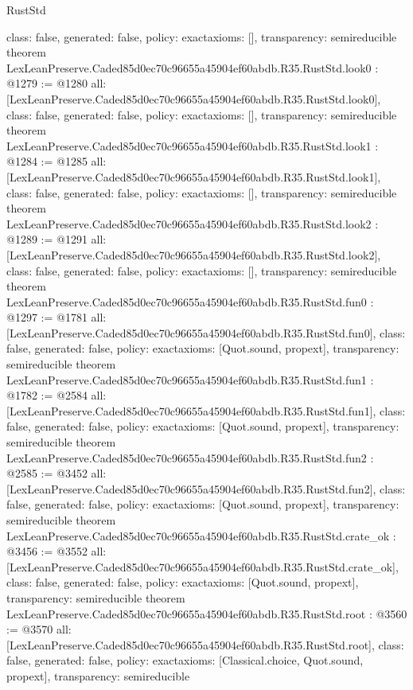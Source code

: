 \begin{lexlean}{RustStd}
\begin{coremodule}
{  class: false,
  generated: false,
  policy: exact{axioms: []},
  transparency: semireducible
}
theorem LexLeanPreserve.Caded85d0ec70c96655a45904ef60abdb.R35.RustStd.look0 : @1279 := @1280 {
  all: [LexLeanPreserve.Caded85d0ec70c96655a45904ef60abdb.R35.RustStd.look0],
  class: false,
  generated: false,
  policy: exact{axioms: []},
  transparency: semireducible
}
theorem LexLeanPreserve.Caded85d0ec70c96655a45904ef60abdb.R35.RustStd.look1 : @1284 := @1285 {
  all: [LexLeanPreserve.Caded85d0ec70c96655a45904ef60abdb.R35.RustStd.look1],
  class: false,
  generated: false,
  policy: exact{axioms: []},
  transparency: semireducible
}
theorem LexLeanPreserve.Caded85d0ec70c96655a45904ef60abdb.R35.RustStd.look2 : @1289 := @1291 {
  all: [LexLeanPreserve.Caded85d0ec70c96655a45904ef60abdb.R35.RustStd.look2],
  class: false,
  generated: false,
  policy: exact{axioms: []},
  transparency: semireducible
}
theorem LexLeanPreserve.Caded85d0ec70c96655a45904ef60abdb.R35.RustStd.fun0 : @1297 := @1781 {
  all: [LexLeanPreserve.Caded85d0ec70c96655a45904ef60abdb.R35.RustStd.fun0],
  class: false,
  generated: false,
  policy: exact{axioms: [Quot.sound, propext]},
  transparency: semireducible
}
theorem LexLeanPreserve.Caded85d0ec70c96655a45904ef60abdb.R35.RustStd.fun1 : @1782 := @2584 {
  all: [LexLeanPreserve.Caded85d0ec70c96655a45904ef60abdb.R35.RustStd.fun1],
  class: false,
  generated: false,
  policy: exact{axioms: [Quot.sound, propext]},
  transparency: semireducible
}
theorem LexLeanPreserve.Caded85d0ec70c96655a45904ef60abdb.R35.RustStd.fun2 : @2585 := @3452 {
  all: [LexLeanPreserve.Caded85d0ec70c96655a45904ef60abdb.R35.RustStd.fun2],
  class: false,
  generated: false,
  policy: exact{axioms: [Quot.sound, propext]},
  transparency: semireducible
}
theorem LexLeanPreserve.Caded85d0ec70c96655a45904ef60abdb.R35.RustStd.crate_ok : @3456 := @3552 {
  all: [LexLeanPreserve.Caded85d0ec70c96655a45904ef60abdb.R35.RustStd.crate_ok],
  class: false,
  generated: false,
  policy: exact{axioms: [Quot.sound, propext]},
  transparency: semireducible
}
theorem LexLeanPreserve.Caded85d0ec70c96655a45904ef60abdb.R35.RustStd.root : @3560 := @3570 {
  all: [LexLeanPreserve.Caded85d0ec70c96655a45904ef60abdb.R35.RustStd.root],
  class: false,
  generated: false,
  policy: exact{axioms: [Classical.choice, Quot.sound, propext]},
  transparency: semireducible
}


\end{coremodule}
\end{lexlean}
